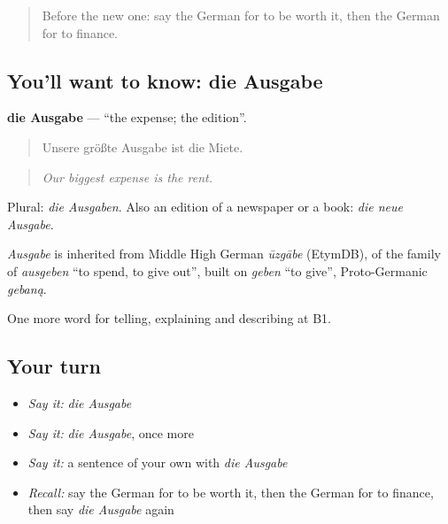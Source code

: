\label{lesson:GE-C389-ausgabe}



\begin{quote}
Before the new one: say the German for to be worth it, then the German for to finance.
\end{quote}

\subsection*{You'll want to know: die Ausgabe}
\textbf{die Ausgabe} — \textquotedblleft{}the expense; the edition\textquotedblright{}.

\begin{quote}
Unsere größte Ausgabe ist die Miete.
\end{quote}

\begin{quote}
\emph{Our biggest expense is the rent.}
\end{quote}

Plural: \emph{die Ausgaben}. Also an edition of a newspaper or a book: \emph{die neue Ausgabe}.

\begin{cousinweb}
\emph{Ausgabe} is inherited from Middle High German \emph{ūzgābe} (EtymDB), of the family of \emph{ausgeben} \textquotedblleft{}to spend, to give out\textquotedblright{}, built on \emph{geben} \textquotedblleft{}to give\textquotedblright{}, Proto-Germanic \emph{gebaną}.
\end{cousinweb}

\begin{grammarlens}[title={What you've built}]
One more word for telling, explaining and describing at B1.
\end{grammarlens}

\subsection*{Your turn}
\begin{itemize}
\raggedright
  \item \emph{Say it:} \emph{die Ausgabe}
  \item \emph{Say it:} \emph{die Ausgabe}, once more
  \item \emph{Say it:} a sentence of your own with \emph{die Ausgabe}
  \item \emph{Recall:} say the German for to be worth it, then the German for to finance, then say \emph{die Ausgabe} again
\end{itemize}

